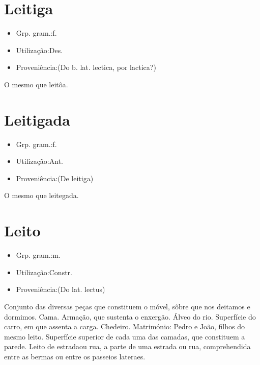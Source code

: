 \section{Leitiga}
\begin{itemize}
\item {Grp. gram.:f.}
\end{itemize}
\begin{itemize}
\item {Utilização:Des.}
\end{itemize}
\begin{itemize}
\item {Proveniência:(Do b. lat. \textunderscore lectica\textunderscore , por \textunderscore lactica\textunderscore ?)}
\end{itemize}
O mesmo que \textunderscore leitôa\textunderscore .
\section{Leitigada}
\begin{itemize}
\item {Grp. gram.:f.}
\end{itemize}
\begin{itemize}
\item {Utilização:Ant.}
\end{itemize}
\begin{itemize}
\item {Proveniência:(De \textunderscore leitiga\textunderscore )}
\end{itemize}
O mesmo que \textunderscore leitegada\textunderscore .
\section{Leito}
\begin{itemize}
\item {Grp. gram.:m.}
\end{itemize}
\begin{itemize}
\item {Utilização:Constr.}
\end{itemize}
\begin{itemize}
\item {Proveniência:(Do lat. \textunderscore lectus\textunderscore )}
\end{itemize}
Conjunto das diversas peças que constituem o móvel, sôbre que nos deitamos e dormimos.
Cama.
Armação, que sustenta o enxergão.
Álveo do rio.
Superfície do carro, em que assenta a carga.
Chedeiro.
Matrimónio: \textunderscore Pedro e João, filhos do mesmo leito\textunderscore .
Superfície superior de cada uma das camadas, que constituem a parede.
\textunderscore Leito de estrada\textunderscore  ou \textunderscore rua\textunderscore , a parte de uma estrada ou rua, comprehendida entre as bermas ou entre os passeios lateraes.
